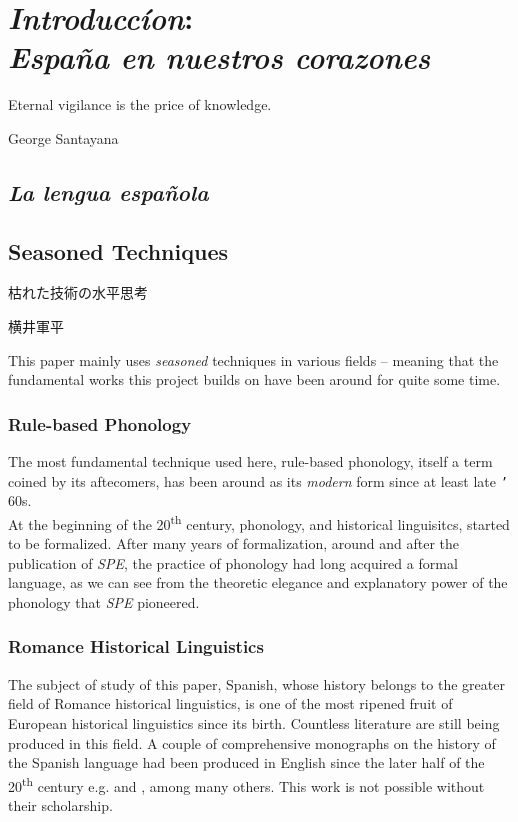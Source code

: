 \documentclass{report}[12pt]
\begin{document}
\pagebreak

\chapter{\emph{Introduccíon}: \\ \emph{España en nuestros corazones}}

\epigraph{Eternal vigilance is the price of knowledge.}{George Santayana}

\section{\emph{La lengua española}}

\section{Seasoned Techniques}

\epigraph{枯れた技術の水平思考\footnotemark}{横井軍平}

This paper mainly uses \emph{seasoned} techniques in various fields -- meaning that the fundamental works this project builds on have been around for quite some time. 

\subsection{Rule-based Phonology}

The most fundamental technique used here, rule-based phonology, itself a term coined by its aftecomers, has been around as its \emph{modern} form since at least late \texttt{'}\kern-1pt 60s. \\
At the beginning of the 20\textsuperscript{th} century, phonology, and historical linguisitcs, started to be formalized. After many years of formalization, around and after the publication of \emph{SPE}, the practice of phonology had long acquired a formal language, as we can see from the theoretic elegance and explanatory power of the phonology that \emph{SPE} pioneered.

\subsection{Romance Historical Linguistics}

The subject of study of this paper, Spanish, whose history belongs to the greater field of Romance historical linguistics, is one of the most ripened fruit of European historical linguistics since its birth. Countless literature are still being produced in this field. A couple of comprehensive monographs on the history of the Spanish language had been produced in English since the later half of the 20\textsuperscript{th} century e.g. \cite{penny_spanish} and \cite{lloyd_spanish}, among many others. This work is not possible without their scholarship.
\end{document}

